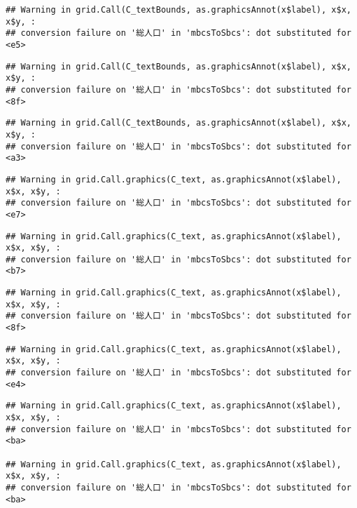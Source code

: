 \documentclass[
]{article}
\begin{document}
\begin{verbatim}
## Warning in grid.Call(C_textBounds, as.graphicsAnnot(x$label), x$x, x$y, :
## conversion failure on '総人口' in 'mbcsToSbcs': dot substituted for <e5>
\end{verbatim}

\begin{verbatim}
## Warning in grid.Call(C_textBounds, as.graphicsAnnot(x$label), x$x, x$y, :
## conversion failure on '総人口' in 'mbcsToSbcs': dot substituted for <8f>
\end{verbatim}

\begin{verbatim}
## Warning in grid.Call(C_textBounds, as.graphicsAnnot(x$label), x$x, x$y, :
## conversion failure on '総人口' in 'mbcsToSbcs': dot substituted for <a3>
\end{verbatim}

\begin{verbatim}
## Warning in grid.Call.graphics(C_text, as.graphicsAnnot(x$label), x$x, x$y, :
## conversion failure on '総人口' in 'mbcsToSbcs': dot substituted for <e7>
\end{verbatim}

\begin{verbatim}
## Warning in grid.Call.graphics(C_text, as.graphicsAnnot(x$label), x$x, x$y, :
## conversion failure on '総人口' in 'mbcsToSbcs': dot substituted for <b7>
\end{verbatim}

\begin{verbatim}
## Warning in grid.Call.graphics(C_text, as.graphicsAnnot(x$label), x$x, x$y, :
## conversion failure on '総人口' in 'mbcsToSbcs': dot substituted for <8f>
\end{verbatim}

\begin{verbatim}
## Warning in grid.Call.graphics(C_text, as.graphicsAnnot(x$label), x$x, x$y, :
## conversion failure on '総人口' in 'mbcsToSbcs': dot substituted for <e4>
\end{verbatim}

\begin{verbatim}
## Warning in grid.Call.graphics(C_text, as.graphicsAnnot(x$label), x$x, x$y, :
## conversion failure on '総人口' in 'mbcsToSbcs': dot substituted for <ba>

## Warning in grid.Call.graphics(C_text, as.graphicsAnnot(x$label), x$x, x$y, :
## conversion failure on '総人口' in 'mbcsToSbcs': dot substituted for <ba>
\end{verbatim}
\end{document}
